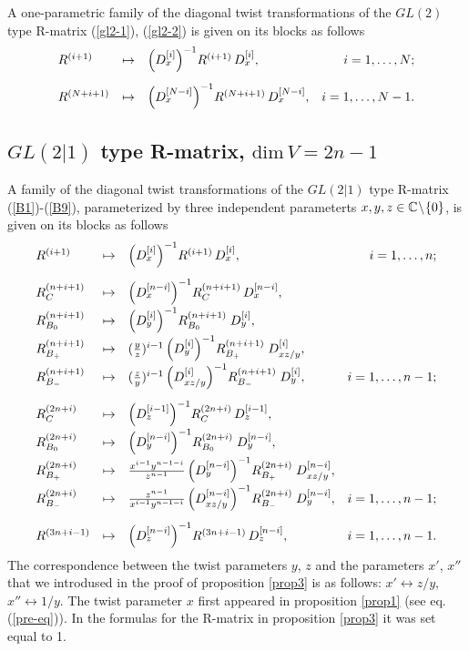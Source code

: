 \documentclass[11pt]{article}
\def\be{\begin{equation}}\def\ee{\end{equation}}
\begin{document}
A one-parametric family of the diagonal twist transformations of the $GL(2)$ type R-matrix (\ref{gl2-1}), (\ref{gl2-2}) is given on its blocks as follows 
\be
\lb{twist-A}
\begin{array}{lclr}
	R^{(i+1)}&\mapsto& \left(D_x^{[i]}\right)^{-1}\! R^{(i+1)}\, D_x^{[i]},& i=1,\dots , N;
	\\[12pt]
	R^{(N+i+1)}&\mapsto& \left(D_{x}^{[N-i]}\right)^{-1}\! R^{(N+i+1)}\, D_{x}^{[N-i]},& i=1,\dots , N-1.
\end{array}
\ee

\subsection{$GL(2|1)$ type R-matrix, $\mbox{dim}\, V=2n-1$}
A family of the diagonal twist transformations of the $GL(2|1)$ type R-matrix (\ref{B1})-(\ref{B9}), parameterized by three independent parameterts $x,y, z\in {\Bbb C}\!\setminus\! \{0\}$, is given on its blocks as follows
\be
\lb{twist-B}
\begin{array}{lclr}
R^{(i+1)}&\mapsto& \left(D_x^{[i]}\right)^{-1}\! R^{(i+1)}\, D_x^{[i]},& i=1,\dots , n;
\\[12pt]
R_{C}^{(n+i+1)}&\mapsto&  \left(D_{x}^{[n-i]}\right)^{-1}\!  R_{C}^{(n+i+1)}\, D_{x}^{[n-i]}, & 
\\[5pt]
R_{B_0}^{(n+i+1)} & \mapsto&   \left(D_{y}^{[i]}\right)^{-1}\! R_{B_0}^{(n+i+1)}\; D_{y}^{[i]}, &
\\[5pt]
R_{B_+}^{(n+i+1)} &\mapsto &  {\textstyle ({y\over z})^{i-1}}\left(D_{y}^{[i]}\right)^{-1}\! 
R_{B_+}^{(n+i+1)}\; D_{x z/y}^{[i]}, & 
\\[5pt]
 R_{B_-}^{(n+i+1)} &\mapsto&  {\textstyle ({z\over y})^{i-1}}\left(D_{x z/ y}^{[i]}\right)^{-1}\! 
R_{B_-}^{(n+i+1)}\; D_{y}^{[i]},
 &i=1,\dots , n-1;
\\[12pt]
R_{C}^{(2n+i)}&\mapsto& \left(D_{z}^{[i-1]}\right)^{-1}\! R_{C}^{(2n+i)}\, D_{z}^{[i-1]}, & 
\\[5pt]
R_{B_0}^{(2n+i)} &\mapsto&  \left(D_{y}^{[n-i]}\right)^{-1}\! R_{B_0}^{(2n+i)}\; D_{y}^{[n-i]}, &
\\[5pt]
R_{B_+}^{(2n+i)} &\mapsto & {\textstyle {x^{i-1}y^{n-1-i}\over z^{n-1}}}  \left(D_{y}^{[n-i]}\right)^{-1}\! 
R_{B_+}^{(2n+i)}\; D_{x z/y}^{[n-i]}, &
\\[5pt]
R_{B_-}^{(2n+i)} &\mapsto& {\textstyle {z^{n-1}\over x^{i-1}y^{n-1-i}}}  \left(D_{x z/ y}^{[n-i]}\right)^{-1}\! 
R_{B_-}^{(2n+i)}\; D_{y}^{[n-i]},&i=1,\dots , n-1;
\\[12pt]
R^{(3n+i-1)}&\mapsto& \left(D_{z}^{[n-i]}\right)^{-1}\! R^{(3n+i-1)}\, D_{z}^{[n-i]},& i=1,\dots , n-1.
\end{array}
\ee
The correspondence between the twist parameters $y$, $z$ and the parameters $x'$, $x''$ that we introdused in the proof of proposition \ref{prop3} is as follows: $x'\leftrightarrow z/y$,~ $x''\leftrightarrow 1/y$. The twist parameter $x$ first appeared in proposition \ref{prop1} (see eq.(\ref{pre-eq})).  In the formulas for the R-matrix in proposition \ref{prop3} it was set equal to 1.
\end{document}
